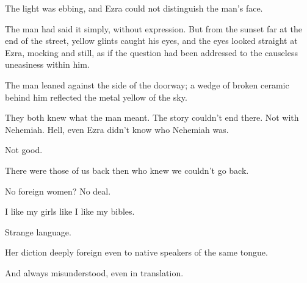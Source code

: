 

{
}
{
}
{
    The light was ebbing, and Ezra could not distinguish the man's face.
}

{
    \hAramaic{}
}
{
    \eAramaic{}
}
{
    The man had said it simply, without expression. But from the sunset
    far at the end of the street, yellow glints caught his eyes,
    and the eyes looked straight at Ezra, mocking and still,
    as if the question had been addressed to the causeless uneasiness within him.
}

{
}
{
}
{
    The man leaned against the side of the doorway; a wedge of broken
    ceramic behind him reflected the metal yellow of the sky.
}

{
}
{
}
{
}

{
}
{
}
{
    They both knew what the man meant. The story couldn't end there.
    Not with Nehemiah. Hell, even Ezra didn't know who Nehemiah was.
}


{
}
{
}
{
    Not good.

    There were those of us back then who knew we couldn't go back.

    No foreign women? No deal.
}

{
    \hX{}
}
{
    \eX{}
}
{
    I like my girls like I like my bibles.

    Strange language.

    Her diction deeply foreign even to native speakers of the same tongue.

    And always misunderstood, even in translation.
}

